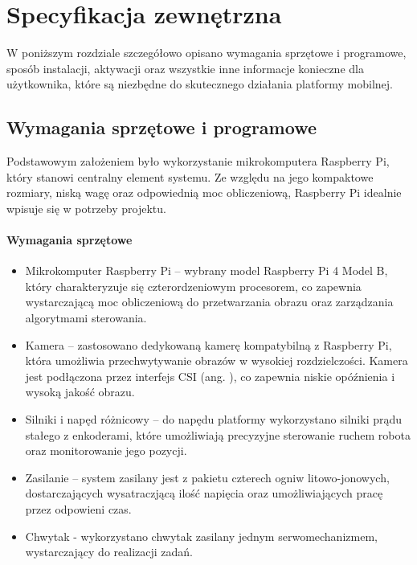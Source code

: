 \chapter{Specyfikacja zewnętrzna}
\label{ch:04}

W poniższym rozdziale szczegółowo opisano wymagania sprzętowe i programowe, sposób instalacji, aktywacji oraz wszystkie inne informacje konieczne dla użytkownika, które są niezbędne do skutecznego działania platformy mobilnej. 

\section{Wymagania sprzętowe i programowe}

Podstawowym założeniem było wykorzystanie mikrokomputera Raspberry Pi, który stanowi centralny element systemu. Ze względu na jego kompaktowe rozmiary, niską wagę oraz odpowiednią moc obliczeniową, Raspberry Pi idealnie wpisuje się w potrzeby projektu.

\subsubsection*{Wymagania sprzętowe}

\begin{itemize}
    \item Mikrokomputer Raspberry Pi – wybrany model Raspberry Pi 4 Model B, który charakteryzuje się czterordzeniowym procesorem, co zapewnia wystarczającą moc obliczeniową do przetwarzania obrazu oraz zarządzania algorytmami sterowania.
    \item Kamera – zastosowano dedykowaną kamerę kompatybilną z Raspberry Pi, która umożliwia przechwytywanie obrazów w wysokiej rozdzielczości. Kamera jest podłączona przez interfejs CSI (ang. ), co zapewnia niskie opóźnienia i wysoką jakość obrazu.
    \item Silniki i napęd różnicowy – do napędu platformy wykorzystano silniki prądu stałego z enkoderami, które umożliwiają precyzyjne sterowanie ruchem robota oraz monitorowanie jego pozycji.
    \item Zasilanie – system zasilany jest z pakietu czterech ogniw litowo-jonowych, dostarczających wysatraczjącą ilość napięcia oraz umożliwiających pracę przez odpowieni czas.
    \item Chwytak - wykorzystano chwytak zasilany jednym serwomechanizmem, wystarczający do realizacji zadań. 
\end{itemize}

